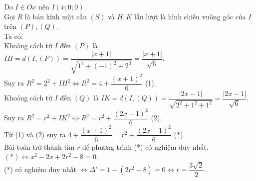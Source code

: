 \begin{ex}
{{
}
\noindent Do $I\in Ox$ nên $I(x;0;0)$.\\
Gọi $R$ là bán kính mặt cầu $(S)$ và $H,K$ lần lượt là hình chiếu vuông góc của $I$ trên $(P), (Q)$.\\
Ta có:\\
Khoảng cách từ $I$ đến $(P)$ là $IH=d(I,(P))=\dfrac{|x+1|}{\sqrt{1^2+(-1)^2+2^2}}=\dfrac{|x+1|}{\sqrt{6}}$.\\
Suy ra $R^2=2^2+IH^2\Leftrightarrow R^2=4+\dfrac{(x+1)^2}{6}$ (1).\\
Khoảng cách từ $I$ đến $(Q)$ là $IK=d(I,(Q))=\dfrac{|2x-1|}{\sqrt{2^2+1^2+1^2}}=\dfrac{|2x-1|}{\sqrt{6}}$.\\
Suy ra $R^2=r^2+IK^2\Leftrightarrow R^2=r^2+\dfrac{(2x-1)^2}{6}$ (2).\\
Từ (1) và (2) suy ra $4+\dfrac{(x+1)^2}{6}=r^2+\dfrac{(2x-1)^2}{6}$ (*).\\
Bài toán trở thành tìm $r$ để phương trình (*) có nghiệm duy nhất.\\
$(*)\Leftrightarrow x^2-2x+2r^2-8=0$.\\
(*) có nghiệm duy nhất $\Leftrightarrow \Delta'=1-(2r^2-8)=0\Leftrightarrow r=\dfrac{3\sqrt{2}}{2}$.
}
\end{ex}

